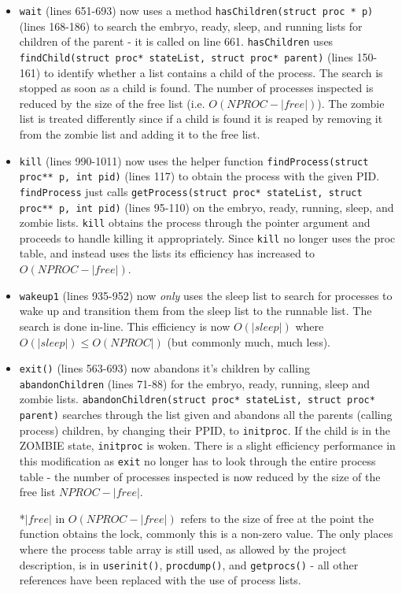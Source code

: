 \documentclass[11pt,letterpaper]{report}
\begin{document}
		\begin{itemize}
			\item {\tt wait} (lines 651-693) now uses a method {\tt hasChildren(struct proc * p)} (lines 168-186) to search the embryo, ready, sleep, and running lists for children of the parent - it is called on line 661. {\tt hasChildren} uses 
			{\tt findChild(struct proc* stateList, struct proc* parent)} (lines 150-161) to identify whether a list contains a child of the process. The search is stopped as soon as a child is found. The number of processes
			inspected is reduced by the size of the free list (i.e. $O(NPROC-|free|)$). The zombie list is treated differently since if a child is found it is reaped by removing it from the zombie list and adding it to the free list. 
			
			\item {\tt kill} (lines 990-1011) now uses the helper function {\tt findProcess(struct proc** p, int pid)} (lines 117) to obtain the process with the given PID. {\tt findProcess} just calls {\tt getProcess(struct proc* stateList, struct proc** p, int pid)} (lines 95-110)
			on the embryo, ready, running, sleep, and zombie lists. {\tt kill} obtains the process through the pointer argument and proceeds to handle killing it appropriately. Since {\tt kill} no longer uses the proc table, and instead uses the lists
			its efficiency has increased to $O(NPROC-|free|)$.
			\item {\tt wakeup1} (lines 935-952) now \emph{only} uses the sleep list to search for processes to wake up and transition them from the sleep list to the runnable list. The search is done in-line. This efficiency is now $O(|sleep|)$
			where $O(|sleep|) \leq O(NPROC|)$ (but commonly much, much less).
			\item {\tt exit()} (lines 563-693) now abandons it's children by calling {\tt abandonChildren} (lines 71-88) for the embryo, ready, running, sleep and zombie lists. {\tt abandonChildren(struct proc* stateList, struct proc* parent)} searches 
				through the list given and abandons all the parents (calling process) children, by changing their PPID, to {\tt initproc}. If the child is in the ZOMBIE state, {\tt initproc} is woken. There is a slight efficiency performance
				in this modification as {\tt exit} no longer has to look through the entire process table - the number of processes inspected is now reduced by the size of the free list $NPROC-|free|$.
				
			*$|free|$ in $O(NPROC-|free|)$ refers to the size of free at the point the function obtains the lock, commonly this is a non-zero value. The only places where the process table array is still used, as allowed by the project description,
			is in {\tt userinit()}, {\tt procdump()}, and {\tt getprocs()} - all other references have been replaced with the use of process lists.
		\end{itemize}
	
\end{document}
